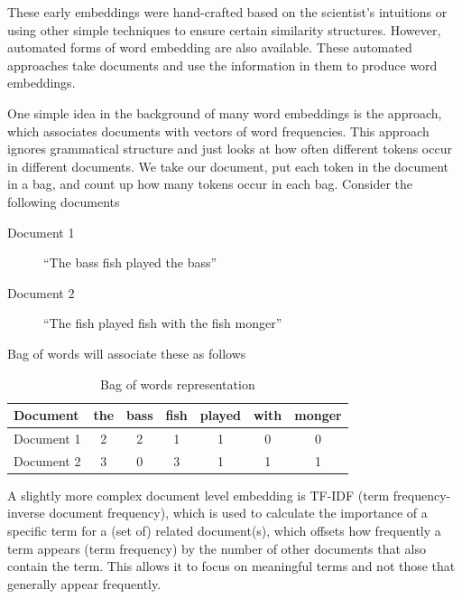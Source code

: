 These early embeddings were hand-crafted based on the scientist's intuitions or using other simple techniques to ensure certain similarity structures. However, automated forms of word embedding are also available. These automated approaches take documents and use the information in them to produce word embeddings.


One simple idea in the background of many word embeddings is the  approach, which associates documents with vectors of word frequencies. This approach ignores grammatical structure and just looks at how often different tokens occur in different documents. We take our document, put each token in the document in a bag, and count up how many tokens occur in each bag.  Consider the following documents

\begin{description}
\item[Document 1]  ``The bass fish played the bass''
\item[Document 2]  ``The fish played fish with the fish monger''
\end{description}

Bag of words will associate these as follows

\begin{table}[h]
    \centering
    \begin{tabular}{|l|c|c|c|c|c|c|}
    \hline
    Document & the & bass & fish & played & with & monger \\
    \hline
    Document 1 & 2 & 2 & 1 & 1 & 0 & 0 \\
    Document 2 & 3 & 0 & 3 & 1 & 1 & 1 \\
    \hline
    \end{tabular}
    \caption{Bag of words representation}
\end{table}

A slightly more complex document level embedding is TF-IDF (term frequency-inverse document frequency), which is used to calculate the importance of a specific term for a (set of) related document(s), which offsets how frequently a term appears (term frequency) by the number of other documents that also contain the term. This allows it to focus on meaningful terms and not those that generally appear frequently. 



